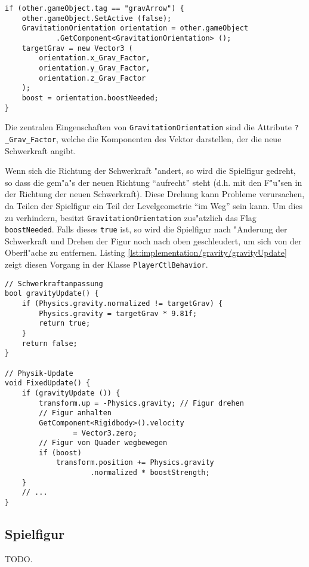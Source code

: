 \begin{lstlisting}[caption={Kollision mit Schwerkraftpfeil},label=lst:implementation/gravity/OnTriggerEnter]
if (other.gameObject.tag == "gravArrow") {
    other.gameObject.SetActive (false);
    GravitationOrientation orientation = other.gameObject
            .GetComponent<GravitationOrientation> ();
    targetGrav = new Vector3 (
        orientation.x_Grav_Factor,
        orientation.y_Grav_Factor,
        orientation.z_Grav_Factor
    );
    boost = orientation.boostNeeded;
}
\end{lstlisting}

Die zentralen Eingenschaften von \texttt{GravitationOrientation} sind
die Attribute \texttt{?\_Grav\_Factor}, welche die Komponenten des Vektor darstellen,
der die neue Schwerkraft angibt.

Wenn sich die Richtung der Schwerkraft "andert, so wird die Spielfigur
gedreht, so dass die gem"a"s der neuen Richtung ``aufrecht'' steht
(d.h. mit den F"u"sen in der Richtung der neuen Schwerkraft). Diese
Drehung kann Probleme verursachen, da Teilen der Spielfigur ein Teil
der Levelgeometrie ``im Weg'' sein kann. Um dies zu verhindern, besitzt
\texttt{GravitationOrientation} zus"atzlich das Flag \texttt{boostNeeded}.
Falls dieses \texttt{true} ist, so wird die Spielfigur nach "Anderung
der Schwerkraft und Drehen der Figur noch nach oben geschleudert, um
sich von der Oberfl"ache zu entfernen. Listing
\ref{lst:implementation/gravity/gravityUpdate} zeigt diesen Vorgang
in der Klasse \texttt{PlayerCtlBehavior}.

\begin{lstlisting}[caption={Anpassung der Schwerkraft und Spielfigur},label=lst:implementation/gravity/gravityUpdate]
// Schwerkraftanpassung
bool gravityUpdate() {
    if (Physics.gravity.normalized != targetGrav) {
        Physics.gravity = targetGrav * 9.81f;
        return true;
    }
    return false;
}

// Physik-Update
void FixedUpdate() {
    if (gravityUpdate ()) {
        transform.up = -Physics.gravity; // Figur drehen
        // Figur anhalten
        GetComponent<Rigidbody>().velocity
                = Vector3.zero;
        // Figur von Quader wegbewegen
        if (boost)
            transform.position += Physics.gravity
                    .normalized * boostStrength;
    }
    // ...
}
\end{lstlisting}
%
\subsection{Spielfigur}
\label{sec:implementation/avatar}
%
TODO.
%
